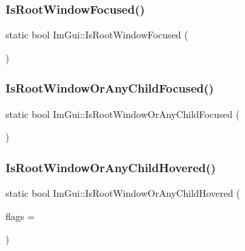\subsubsection{\texorpdfstring{Is\+Root\+Window\+Focused()}{IsRootWindowFocused()}}
{\footnotesize\ttfamily static bool Im\+Gui\+::\+Is\+Root\+Window\+Focused (\begin{DoxyParamCaption}{ }\end{DoxyParamCaption})\hspace{0.3cm}{\ttfamily [static]}}

\hypertarget{namespace_im_gui_a1aafbea10ef614c5bf274b29c230f547}{}\label{namespace_im_gui_a1aafbea10ef614c5bf274b29c230f547} 
\subsubsection{\texorpdfstring{Is\+Root\+Window\+Or\+Any\+Child\+Focused()}{IsRootWindowOrAnyChildFocused()}}
{\footnotesize\ttfamily static bool Im\+Gui\+::\+Is\+Root\+Window\+Or\+Any\+Child\+Focused (\begin{DoxyParamCaption}{ }\end{DoxyParamCaption})\hspace{0.3cm}{\ttfamily [static]}}

\hypertarget{namespace_im_gui_a048d3ecb7eb03f3416900dfbaac09d3f}{}\label{namespace_im_gui_a048d3ecb7eb03f3416900dfbaac09d3f} 
\subsubsection{\texorpdfstring{Is\+Root\+Window\+Or\+Any\+Child\+Hovered()}{IsRootWindowOrAnyChildHovered()}}
{\footnotesize\ttfamily static bool Im\+Gui\+::\+Is\+Root\+Window\+Or\+Any\+Child\+Hovered (\begin{DoxyParamCaption}\item[{Im\+Gui\+Hovered\+Flags}]{flags = {} }\end{DoxyParamCaption})\hspace{0.3cm}{\ttfamily [static]}}

\hypertarget{namespace_im_gui_a99fd14154aae264087d471132e56a42e}{}\label{namespace_im_gui_a99fd14154aae264087d471132e56a42e} 
